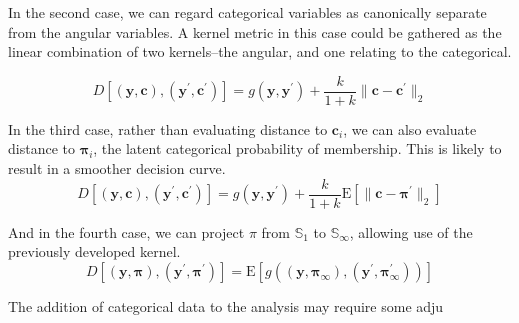 In the second case, we can regard categorical variables as canonically separate from the angular variables. 
    A kernel metric in this case could be gathered as the linear combination of two kernels--the angular, and one relating to the categorical.
    
\begin{equation*}
    D\left[(\bm{y},\bm{c}), (\bm{y}^{\prime}, \bm{c}^{\prime})\right] = g(\bm{y},\bm{y}^{\prime}) + \frac{k}{1 + k}\lVert \bm{c} - \bm{c}^{\prime}\rVert_2
\end{equation*}
    
In the third case, rather than evaluating distance to $\bm{c}_i$, we can also evaluate distance to $\bm{\pi}_i$,
    the latent categorical probability of membership.  This is likely to result in a smoother decision curve.
\begin{equation*}
    D\left[(\bm{y},\bm{c}), (\bm{y}^{\prime}, \bm{c}^{\prime})\right] = g(\bm{y},\bm{y}^{\prime}) + \frac{k}{1 + k}\text{E}\left[\lVert \bm{c} - \bm{\pi}^{\prime}\rVert_2\right]
\end{equation*}

And in the fourth case, we can project $\pi$ from $\mathbb{S}_1$ to $\mathbb{S}_{\infty}$, allowing use of
    the previously developed kernel.
\begin{equation*}
    D\left[(\bm{y},\bm{\pi}), (\bm{y}^{\prime}, \bm{\pi}^{\prime})\right] = \text{E}\left[ g\left((\bm{y},\bm{\pi}_{\infty}), (\bm{y}^{\prime},\bm{\pi}_{\infty}^{\prime})\right)\right]
\end{equation*}



The addition of categorical data to the analysis may require some adju







